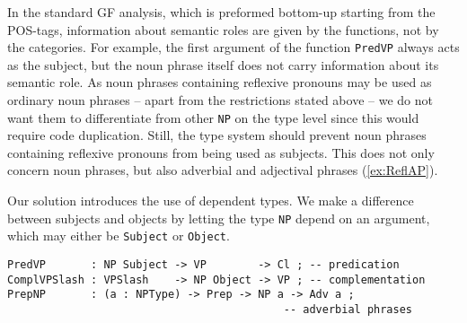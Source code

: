 \documentclass[runningheads,a4paper]{llncs}
\begin{document}

In the standard GF analysis, which is preformed bottom-up starting from the
POS-tags, information about semantic roles are given by the functions, not by the
categories. For example, the first argument of the function 
\verb-PredVP- always acts as the subject, but the noun phrase itself does not carry
information about its semantic role.
As noun phrases containing reflexive pronouns may be used as ordinary
noun phrases -- apart from the restrictions stated above --
we do not want them to differentiate
from other \verb-NP- on the type level since this would require code duplication.
Still, the type system should prevent noun phrases containing reflexive
pronouns from being used as subjects.
This does not only concern noun phrases, but also adverbial and adjectival phrases 
(\ref{ex:ReflAP}).

Our solution introduces the use of dependent types.
We make a difference between subjects and objects
by letting the type \verb-NP- depend on an argument, 
which may either be \verb-Subject- or
\verb-Object-.
\begin{verbatim}
PredVP       : NP Subject -> VP        -> Cl ; -- predication
ComplVPSlash : VPSlash    -> NP Object -> VP ; -- complementation
PrepNP       : (a : NPType) -> Prep -> NP a -> Adv a ; 
                                           -- adverbial phrases 
\end{verbatim}
\end{document}

